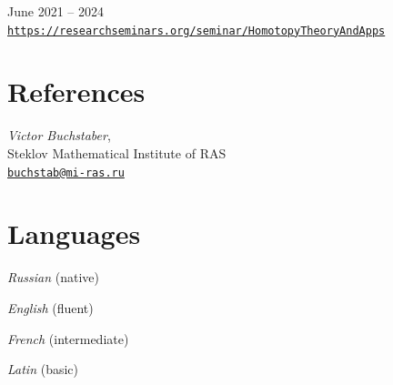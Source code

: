 \documentclass[11pt,letterpaper]{report}
\newcommand{\listitemspace}{0.25em}
\renewenvironment{itemize}
{\begin{list}{}{\setlength{\leftmargin}{0em}
                \setlength{\parskip}{0em}
                \setlength{\itemsep}{\listitemspace}
                \setlength{\parsep}{\listitemspace}}}
{\end{list}}
\begin{document}
    \begin{tablist}

       \item{June 2021 -- 2024} \\ \href{https://researchseminars.org/seminar/HomotopyTheoryAndApps}{\tt https://researchseminars.org/seminar/HomotopyTheoryAndApps} 

    \end{tablist}
    
    
    
    
    
    \section*{References}

    \begin{itemize}

       \item[] {\it Victor Buchstaber}, \\ Steklov Mathematical Institute of RAS\\ \href{mailto:buchstab@mi-ras.ru}{\tt buchstab@mi-ras.ru} 

    \end{itemize}
    
    
    
    
    
     \section*{Languages}

    \begin{itemize}

       \item[] {\it Russian} (native)
       \item[] {\it English} (fluent)
       \item[] {\it French} (intermediate)
       \item[] {\it Latin} (basic)

    \end{itemize}

  

      
\end{document}
